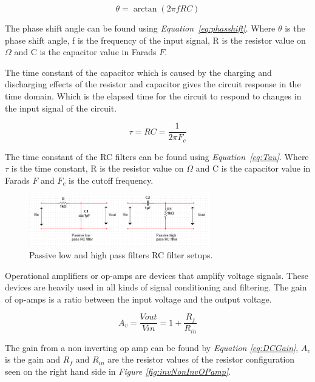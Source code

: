 \begin{equation}
    \theta = \arctan(2 \pi fRC)
    \label{eq:phasshift}
\end{equation}

The phase shift angle can be found using \textit{Equation~\ref{eq:phasshift}}.
Where $\theta$ is the phase shift angle, f is the frequency of the input signal, R is the resistor value on $\Omega$ and C is the capacitor value in Farads $F$.

The time constant of the capacitor which is caused by the charging and discharging effects of the resistor and capacitor gives the circuit response in the time domain. 
Which is the elapsed time for the circuit to respond to changes in the input signal of the circuit.


\begin{equation}
    \tau = RC = \frac{1}{2\pi F_c}
    \label{eq:Tau}
\end{equation}

The time constant of the RC filters can be found using \textit{Equation~\ref{eq:Tau}}. 
Where $\tau$ is the time constant, R is the resistor value on $\Omega$ and C is the capacitor value in Farads $F$ and $F_c$ is the cutoff frequency. 

\begin{figure}[h]
    \centering
    \includegraphics[width=0.70\textwidth]{graphics/passivehighlow.png}
    \caption{Passive low and high pass filters RC filter setups.}
    \label{fig:PassiveHighLow}
\end{figure}

Operational amplifiers or op-amps are devices that amplify voltage signals.
These devices are heavily used in all kinds of signal conditioning and filtering.
The gain of op-amps is a ratio between the input voltage and the output voltage. 

\begin{equation}
    A_v = \frac{V{out}}{V{in}} = 1 + \frac{R_f}{R_{in}}
    \label{eq:DCGain}
\end{equation}

The gain from a non inverting op amp can be found by \textit{Equation \ref{eq:DCGain}}, $A_v$ is the gain and $R_f$ and $R_{in}$ are the resistor values of the resistor configuration seen on the right hand side in \textit{Figure \ref{fig:invNonInvOPamp}}.


